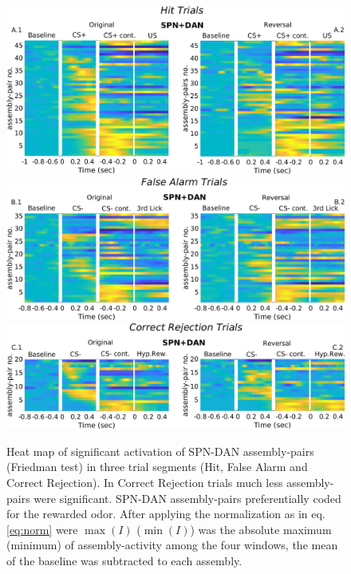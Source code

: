 \begin{figure}[H]
\centering
\includegraphics[scale=0.33]{figures/SPN_DANHit.pdf}
\includegraphics[scale=0.33]{figures/HeatFA_SPN_DAN.pdf}
\includegraphics[scale=0.33]{figures/HeatCR_SPN_DAN.pdf}
\caption{Heat map of significant activation of SPN-DAN assembly-pairs (Friedman test) in three trial segments (Hit, False Alarm and Correct Rejection). In Correct Rejection trials much less assembly-pairs were significant. SPN-DAN assembly-pairs preferentially coded for the rewarded odor. After applying the normalization as in eq. \ref{eq:norm} were $\max(I)$ ($\min(I)$) was the absolute maximum (minimum) of assembly-activity among the four windows, the mean of the baseline was subtracted to each assembly.}
\label{fig:HeatSPN_DANComp}
\end{figure}
